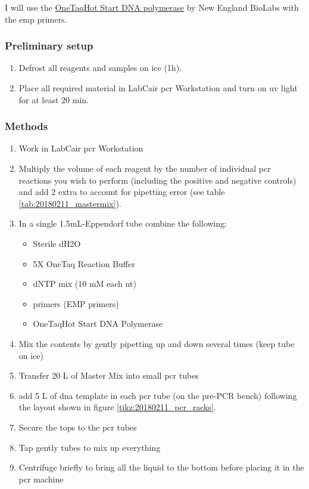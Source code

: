 I will use the \href{https://www.neb.com/products/m0481-onetaq-hot-start-dna-polymerase#Product%20Information}{OneTaq\cR Hot Start DNA polymerase} by New England BioLabs with the \gls{emp} primers.

\subsubsection{Preliminary setup}

\begin{enumerate}
\item Defrost all reagents and samples on ice (1h). 
\item Place all required material in LabCair \gls{pcr} Workstation and turn on \gls{uv} light for at least 20 min.
\end{enumerate}

\subsubsection{Methods}

\begin{enumerate}
\item Work in LabCair \gls{pcr} Workstation
\item Multiply the volume of each reagent by the number of individual \gls{pcr} reactions you wish to perform (including the positive and negative controls) and add 2 extra to account for pipetting error (see table \ref{tab:20180211_mastermix}).
\item In a single 1.5mL-Eppendorf tube combine the following:
	\begin{itemize}
	\item Sterile dH2O
	\item 5X OneTaq Reaction Buffer
	\item dNTP mix (10 mM each nt)
	\item primers (EMP primers)
	\item OneTaq\cR Hot Start DNA Polymerase
	\end{itemize}
\item Mix the contents by gently pipetting up and down several times (keep tube on ice)
\item Transfer  20 \textmu L of Master Mix into small \gls{pcr} tubes
\item add 5 \textmu L of \gls{dna} template in each \gls{pcr} tube (on the pre-PCR bench) following the layout shown in figure \ref{tikz:20180211_pcr_racks}.
\item Secure the tops to the \gls{pcr} tubes
\item Tap gently tubes to mix up everything
\item Centrifuge briefly to bring all the liquid to the bottom before placing it in the \gls{pcr} machine
\end{enumerate}

